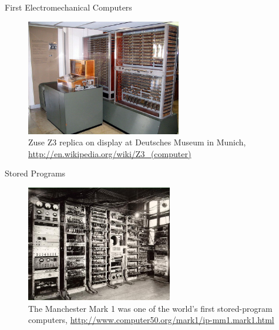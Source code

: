 \documentclass[xcolor=x11names,compress]{beamer}
\renewcommand{\(}{\begin{columns}}
\renewcommand{\)}{\end{columns}}
\newcommand{\<}[1]{\begin{column}{#1}}
\renewcommand{\>}{\end{column}}
\begin{document}
\begin{frame}{First Electromechanical Computers}

\begin{figure}
\includegraphics[height=2in,clip]{../figs/Z3DeutschesMuseum}
\caption{Zuse Z3 replica on display at Deutsches Museum in Munich, \href{http://en.wikipedia.org/wiki/Z3_(computer)}{http://en.wikipedia.org/wiki/Z3\_(computer)}}
\end{figure}

\end{frame}

\begin{frame}{Stored Programs}

\begin{figure}
\includegraphics[height=2in,clip]{../figs/ManchesterMark1}
\caption{The Manchester Mark 1 was one of the world's first stored-program computers, \href{http://www.computer50.org/mark1/ip-mm1.mark1.html}{http://www.computer50.org/mark1/ip-mm1.mark1.html}}
\end{figure}

\end{frame}
\end{document}
